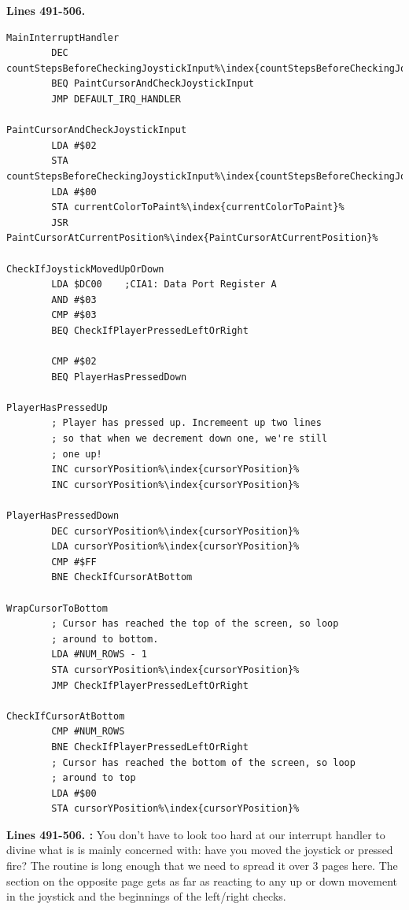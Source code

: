 \clearpage
\textbf{Lines 491-506. }
\begin{lstlisting}[caption= This is our interrupt handler\, it runs 60 times a second so has to be fast.,escapechar=\%]
MainInterruptHandler   
        DEC countStepsBeforeCheckingJoystickInput%\index{countStepsBeforeCheckingJoystickInput}%
        BEQ PaintCursorAndCheckJoystickInput
        JMP DEFAULT_IRQ_HANDLER

PaintCursorAndCheckJoystickInput   
        LDA #$02
        STA countStepsBeforeCheckingJoystickInput%\index{countStepsBeforeCheckingJoystickInput}%
        LDA #$00
        STA currentColorToPaint%\index{currentColorToPaint}%
        JSR PaintCursorAtCurrentPosition%\index{PaintCursorAtCurrentPosition}%

CheckIfJoystickMovedUpOrDown   
        LDA $DC00    ;CIA1: Data Port Register A
        AND #$03
        CMP #$03
        BEQ CheckIfPlayerPressedLeftOrRight

        CMP #$02
        BEQ PlayerHasPressedDown

PlayerHasPressedUp
        ; Player has pressed up. Incremeent up two lines
        ; so that when we decrement down one, we're still
        ; one up!
        INC cursorYPosition%\index{cursorYPosition}%
        INC cursorYPosition%\index{cursorYPosition}%

PlayerHasPressedDown   
        DEC cursorYPosition%\index{cursorYPosition}%
        LDA cursorYPosition%\index{cursorYPosition}%
        CMP #$FF
        BNE CheckIfCursorAtBottom

WrapCursorToBottom
        ; Cursor has reached the top of the screen, so loop
        ; around to bottom.
        LDA #NUM_ROWS - 1
        STA cursorYPosition%\index{cursorYPosition}%
        JMP CheckIfPlayerPressedLeftOrRight

CheckIfCursorAtBottom   
        CMP #NUM_ROWS
        BNE CheckIfPlayerPressedLeftOrRight
        ; Cursor has reached the bottom of the screen, so loop
        ; around to top
        LDA #$00
        STA cursorYPosition%\index{cursorYPosition}%

\end{lstlisting}
\clearpage

\textbf{Lines 491-506. :}  You don't have to look too hard at our interrupt handler
to divine what is is mainly concerned with: have you moved the joystick or pressed fire? The routine is long enough
that we need to spread it over 3 pages here. The section on the opposite page gets as far as reacting to any up or
down movement in the joystick and the beginnings of the left/right checks. 

